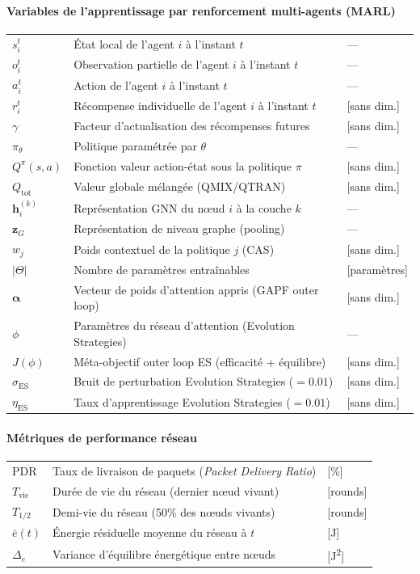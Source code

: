 \paragraph{Variables de l'apprentissage par renforcement multi-agents (MARL)}
\begin{longtable}{lp{3in}l}
$s_i^t$ & État local de l'agent $i$ à l'instant $t$ & --- \\
$o_i^t$ & Observation partielle de l'agent $i$ à l'instant $t$ & --- \\
$a_i^t$ & Action de l'agent $i$ à l'instant $t$ & --- \\
$r_i^t$ & Récompense individuelle de l'agent $i$ à l'instant $t$ & [sans dim.] \\
$\gamma$ & Facteur d'actualisation des récompenses futures & [sans dim.] \\
$\pi_\theta$ & Politique paramétrée par $\theta$ & --- \\
$Q^\pi(s,a)$ & Fonction valeur action-état sous la politique $\pi$ & [sans dim.] \\
$Q_{\text{tot}}$ & Valeur globale mélangée (QMIX/QTRAN) & [sans dim.] \\
$\mathbf{h}_i^{(k)}$ & Représentation GNN du nœud $i$ à la couche $k$ & --- \\
$\mathbf{z}_G$ & Représentation de niveau graphe (pooling) & --- \\
$w_j$ & Poids contextuel de la politique $j$ (CAS) & [sans dim.] \\
$|\Theta|$ & Nombre de paramètres entraînables & [paramètres] \\
$\boldsymbol{\alpha}$ & Vecteur de poids d'attention appris (GAPF outer loop) & [sans dim.] \\
$\phi$ & Paramètres du réseau d'attention (Evolution Strategies) & --- \\
$J(\phi)$ & Méta-objectif outer loop ES (efficacité + équilibre) & [sans dim.] \\
$\sigma_{\text{ES}}$ & Bruit de perturbation Evolution Strategies ($= 0.01$) & [sans dim.] \\
$\eta_{\text{ES}}$ & Taux d'apprentissage Evolution Strategies ($= 0.01$) & [sans dim.] \\
\end{longtable}

\paragraph{Métriques de performance réseau}
\begin{longtable}{lp{3in}l}
PDR & Taux de livraison de paquets (\emph{Packet Delivery Ratio}) & [\%] \\
$T_{\text{vie}}$ & Durée de vie du réseau (dernier nœud vivant) & [rounds] \\
$T_{1/2}$ & Demi-vie du réseau (50\% des nœuds vivants) & [rounds] \\
$\bar{e}(t)$ & Énergie résiduelle moyenne du réseau à $t$ & [J] \\
$\Delta_e$ & Variance d'équilibre énergétique entre nœuds & [J\textsuperscript{2}] \\
\end{longtable}

